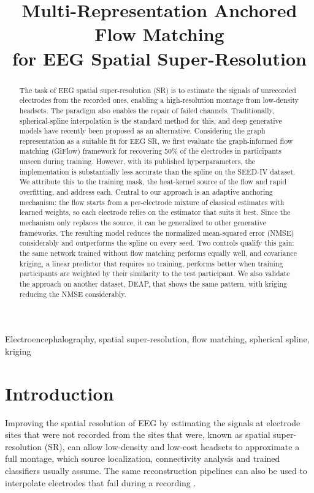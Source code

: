 \documentclass{article}
\title{Multi-Representation Anchored Flow Matching\\
for EEG Spatial Super-Resolution}
\begin{document}
\maketitle

\begin{abstract}
The task of EEG spatial super-resolution (SR) is to estimate the signals of
unrecorded electrodes from the recorded ones, enabling a high-resolution
montage from low-density headsets. The paradigm also enables the repair of
failed channels. Traditionally, spherical-spline interpolation is the
standard method for this, and deep generative models have recently been
proposed as an alternative. Considering the graph representation as a
suitable fit for EEG SR, we first evaluate the graph-informed flow
matching (GiFlow) framework for recovering 50\% of the electrodes in
participants unseen during training. However, with its published
hyperparameters, the implementation is substantially less accurate than
the spline on the SEED-IV dataset. We attribute this to the training mask,
the heat-kernel source of the flow and rapid overfitting, and address each.
Central to our approach is an adaptive anchoring mechanism: the flow
starts from a per-electrode mixture of classical estimates with learned
weights, so each electrode relies on the estimator that suits it best.
Since the mechanism only replaces the source, it can be generalized to
other generative frameworks. The resulting model reduces the normalized
mean-squared error (NMSE) considerably and outperforms the spline on every
seed. Two controls qualify this gain: the same network trained without
flow matching performs equally well, and covariance kriging, a linear
predictor that requires no training, performs better when training
participants are weighted by their similarity to the test participant. We
also validate the approach on another dataset, DEAP, that shows the same
pattern, with kriging reducing the NMSE considerably.
\end{abstract}

\begin{keywords}
Electroencephalography, spatial super-resolution, flow matching,
spherical spline, kriging
\end{keywords}

\section{Introduction}
\label{sec:intro}

Improving the spatial resolution of EEG by estimating the signals at
electrode sites that were not recorded from the sites that were, known as
spatial super-resolution (SR), can allow low-density and low-cost headsets
to approximate a full montage, which source localization, connectivity
analysis and trained classifiers usually assume. The same reconstruction
pipelines can also be used to interpolate electrodes that fail during a
recording \cite{bigdely2015prep}.
\end{document}
